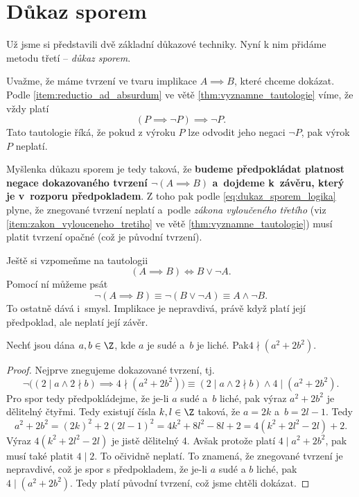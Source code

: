 \section{Důkaz sporem}\label{sec:dukaz_sporem}
Už jsme si představili dvě základní důkazové techniky. Nyní k nim přidáme metodu třetí -- \emph{důkaz sporem}.\par
Uvažme, že máme tvrzení ve tvaru implikace $A \implies B$, které chceme dokázat. Podle \ref{item:reductio_ad_absurdum} ve větě \ref{thm:vyznamne_tautologie} víme, že vždy platí
\begin{equation}\label{eq:dukaz_sporem_logika}
    (P \implies \neg P) \implies \neg P.
\end{equation}
Tato tautologie říká, že pokud z výroku $P$ lze odvodit jeho negaci $\neg P$, pak výrok $P$ neplatí.\par
Myšlenka důkazu sporem je tedy taková, že \textbf{budeme předpokládat platnost negace dokazovaného tvrzení $\neg (A \implies B)$ a~dojdeme k~závěru, který je v~rozporu předpokladem}. Z toho pak podle \eqref{eq:dukaz_sporem_logika} plyne, že znegované tvrzení neplatí a~podle \emph{zákona vyloučeného třetího} (viz \ref{item:zakon_vylouceneho_tretiho} ve větě \ref{thm:vyznamne_tautologie}) musí platit tvrzení opačné (což je původní tvrzení).\par
Ještě si vzpomeňme na tautologii
\begin{equation*}
    (A \implies B) \iff B \lor \neg A.
\end{equation*}
Pomocí ní můžeme psát
\begin{equation*}
    \neg (A \implies B) \equiv \neg (B \lor \neg A) \equiv A \land \neg B.
\end{equation*}
To ostatně dává i~smysl. Implikace je nepravdivá, právě když platí její předpoklad, ale neplatí její závěr.
\begin{proposition}
    Nechť jsou dána $a,b\in\Z$, kde $a$ je sudé a~$b$ je liché. Pak\linebreak $4 \nmid (a^2+2b^2)$.
\end{proposition}
\begin{proof}
    Nejprve znegujeme dokazované tvrzení, tj.
    \begin{equation*}
        \neg \bigl((2 \mid a \land 2 \nmid b) \implies 4 \nmid (a^2+2b^2)\bigr) \equiv (2 \mid a \land 2 \nmid b) \land 4 \mid (a^2+2b^2).
    \end{equation*}
    Pro spor tedy předpokládejme, že je-li $a$ sudé a~$b$ liché, pak výraz $a^2+2b^2$ je dělitelný čtyřmi. Tedy existují čísla $k,l\in\Z$ taková, že $a=2k$ a~$b=2l-1$. Tedy
    \begin{equation*}
        a^2+2b^2=(2k)^2+2(2l-1)^2=4k^2+8l^2-8l+2=4(k^2+2l^2-2l)+2.
    \end{equation*}
    Výraz $4(k^2+2l^2-2l)$ je jistě dělitelný 4. Avšak protože platí $4 \mid a^2+2b^2$, pak musí také platit $4 \mid 2$. To očividně neplatí. To znamená, že znegované tvrzení je nepravdivé, což je spor s předpokladem, že je-li $a$ sudé a $b$ liché, pak $4 \mid (a^2+2b^2)$. Tedy platí původní tvrzení, což jsme chtěli dokázat.
\end{proof}
